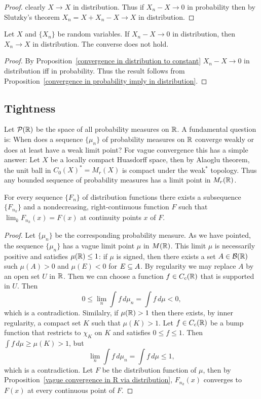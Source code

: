 \begin{proof}
clearly $X\to X$ in distribution. Thus if $X_n-X\to 0$ in probability then by Slutzky's theorem $X_n=X+X_n-X\to X$ in distribution.
\end{proof}
\begin{corollary}
Let $X$ and $\{X_n\}$ be random variables. If $X_n-X\to 0$ in distribution, then $X_n\to X$ in distribution. The converse does not hold.
\end{corollary}
\begin{proof}
By Proposition~\ref{convergence in distribution to constant} $X_n-X\to 0$ in distribution iff in probability. Thus the result follows from Proposition~\ref{convergence in probability imply in distribution}.
\end{proof}
\subsection{Tightness}
Let $\mathcal{P}(\mathbb{R})$ be the space of all probability measures on $\mathbb{R}$. A fundamental question is: When does a sequence $\{\mu_n\}$ of probability measures on $\mathbb{R}$ converge weakly or does at least have a weak limit point? For vague convergence this has a simple answer: Let $X$ be a locally compact Huasdorff space, then by Alaoglu theorem, the unit ball in $C_0(X)^*=M_r(X)$ is compact under the weak$^*$ topology. Thus any bounded sequence of probability measures has a limit point in $M_r(\mathbb{R})$.
\begin{theorem}
For every sequence $\{F_n\}$ of distribution functions there exists a subsequence $\{F_{n_k}\}$ and a nondecreasing, right-continuous function $F$ such that $\lim_kF_{n_k}(x)=F(x)$ at continuity points $x$ of $F$.
\end{theorem}
\begin{proof}
Let $\{\mu_n\}$ be the corresponding probability measure. As we have pointed, the sequence $\{\mu_n\}$ has a vague limit point $\mu$ in $M(\mathbb{R})$. This limit $\mu$ is necessarily positive and satisfies $\mu(\mathbb{R})\leq 1$: if $\mu$ is signed, then there exists a set $A\in\mathcal{B}(\mathbb{R})$ such $\mu(A)>0$ and $\mu(E)<0$ for $E\subseteq A$. By regularity we may replace $A$ by an open set $U$ in $\mathbb{R}$. Then we can choose a function $f\in C_c(\mathbb{R})$ that is supported in $U$. Then
\[0\leq \lim_n\int f\,d\mu_n=\int f\,d\mu<0,\]
which is a contradiction. Similalry, if $\mu(\mathbb{R})>1$ then there exists, by inner regularity, a compact set $K$ such that $\mu(K)>1$. Let $f\in C_c(\mathbb{R})$ be a bump function that restricts to $\chi_K$ on $K$ and satisfies $0\leq f\leq 1$. Then $\int f\,d\mu\geq\mu(K)>1$, but
\[\lim_n\int f\,d\mu_n=\int f\,d\mu\leq 1,\]
which is a contradiction. Let $F$ be the distribution function of $\mu$, then by Proposition~\ref{vague convergence in R via distribution}, $F_{n_k}(x)$ converges to $F(x)$ at every continuous point of $F$.
\end{proof}
